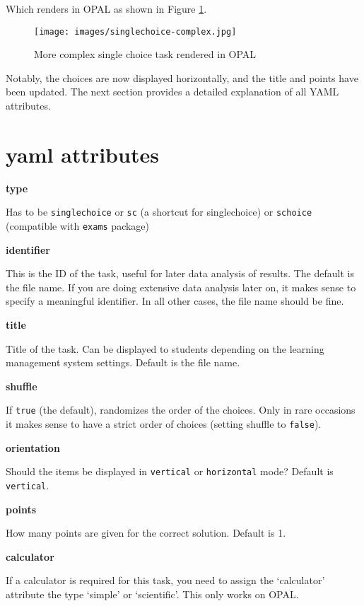 \documentclass[twoside]{tufte-book}
\begin{document}
Which renders in OPAL as shown in Figure \ref{sc2opal}.

\begin{figure}
\centering
\texttt{[image: images/singlechoice-complex.jpg]}
\caption{\label{sc2opal}More complex single choice task rendered in OPAL}
\end{figure}

Notably, the choices are now displayed horizontally, and the title and points have been updated. The next section provides a detailed explanation of all YAML attributes.

\section{yaml attributes}\label{yaml-attributes}

\noindent\textbf{type}\label{type}

Has to be \texttt{singlechoice} or \texttt{sc} (a shortcut for singlechoice) or \texttt{schoice} (compatible with \texttt{exams} package)

\noindent\textbf{identifier}\label{identifier}

This is the ID of the task, useful for later data analysis of results. The default is the file name. If you are doing extensive data analysis later on, it makes sense to specify a meaningful identifier. In all other cases, the file name should be fine.

\noindent\textbf{title}\label{title}

Title of the task. Can be displayed to students depending on the learning management system settings. Default is the file name.

\noindent\textbf{shuffle}\label{shuffle}

If \texttt{true} (the default), randomizes the order of the choices. Only in rare occasions it makes sense to have a strict order of choices (setting shuffle to \texttt{false}).

\noindent\textbf{orientation}\label{orientation}

Should the items be displayed in \texttt{vertical} or \texttt{horizontal} mode? Default is \texttt{vertical}.

\noindent\textbf{points}\label{points}

How many points are given for the correct solution. Default is 1.

\noindent\textbf{calculator}\label{calculator}

If a calculator is required for this task, you need to assign the `calculator' attribute the type `simple' or `scientific'. This only works on OPAL.
\end{document}
